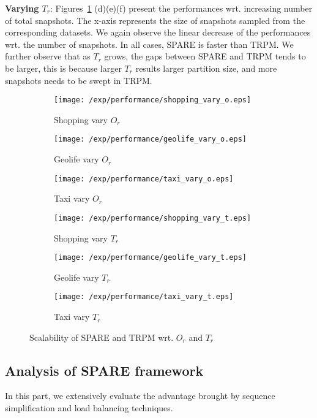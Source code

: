 \textbf{Varying $T_r$}: Figures~\ref{exp:performance_vary_OT} (d)(e)(f) present 
the performances wrt. increasing number of total snapshots.  The x-axis represents the size of
snapshots sampled from the corresponding datasets. We again observe the linear decrease of
the performances wrt. the number of snapshots. In all cases, SPARE is faster than
TRPM. We further observe that as $T_r$ grows, the gaps between SPARE and TRPM tends
to be larger, this is because larger $T_r$ results larger partition size, and more 
snapshots needs to be swept in TRPM.

\begin{figure}[h]
\centering
	\begin{subfigure}[b]{0.22\textwidth}
	 \texttt{[image: /exp/performance/shopping\_vary\_o.eps]}
        \caption{Shopping vary $O_r$}
    \end{subfigure}
 	 \begin{subfigure}[b]{0.22\textwidth}
        \texttt{[image: /exp/performance/geolife\_vary\_o.eps]}
        \caption{Geolife vary $O_r$}
    \end{subfigure}
    	 \begin{subfigure}[b]{0.22\textwidth}
        \texttt{[image: /exp/performance/taxi\_vary\_o.eps]}
        \caption{Taxi vary $O_r$}
    \end{subfigure}
    \begin{subfigure}[b]{0.22\textwidth}
	 \texttt{[image: /exp/performance/shopping\_vary\_t.eps]}
        \caption{Shopping vary $T_r$}
    \end{subfigure}
 	 \begin{subfigure}[b]{0.22\textwidth}
        \texttt{[image: /exp/performance/geolife\_vary\_t.eps]}
        \caption{Geolife vary $T_r$}
    \end{subfigure}
    	 \begin{subfigure}[b]{0.22\textwidth}
        \texttt{[image: /exp/performance/taxi\_vary\_t.eps]}
        \caption{Taxi vary $T_r$}
    \end{subfigure}
 \caption{Scalability of SPARE and TRPM wrt. $O_r$ and $T_r$}
 \label{exp:performance_vary_OT}
\end{figure}



\subsection{Analysis of SPARE framework}
In this part, we extensively evaluate the advantage brought by 
sequence simplification and load balancing techniques.

